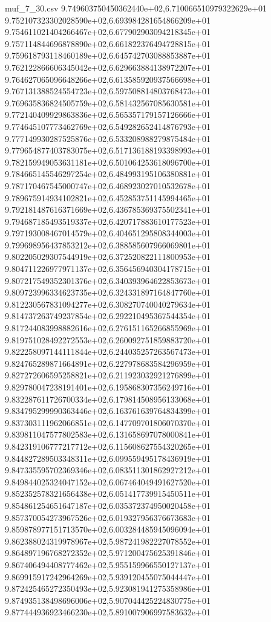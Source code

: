 \begin{filecontents*}{muf_7_30.csv}
9.749603750450362440e+02,6.710066510979322629e+01
9.752107323302028590e+02,6.693984281654866209e+01
9.754611021404266467e+02,6.677902903094218345e+01
9.757114844696878890e+02,6.661822376494728815e+01
9.759618793118460189e+02,6.645742703088853887e+01
9.762122866606345042e+02,6.629663884138972207e+01
9.764627065096648266e+02,6.613585920937566698e+01
9.767131388524554723e+02,6.597508814803768473e+01
9.769635836824505759e+02,6.581432567085630581e+01
9.772140409929863836e+02,6.565357179157126666e+01
9.774645107773462769e+02,6.549282652414876793e+01
9.777149930287525876e+02,6.533208988279875484e+01
9.779654877403783075e+02,6.517136188193398993e+01
9.782159949053631181e+02,6.501064253618096700e+01
9.784665145546297254e+02,6.484993195106380881e+01
9.787170467545000747e+02,6.468923027010532678e+01
9.789675914934102821e+02,6.452853751145994465e+01
9.792181487616371669e+02,6.436785369375502341e+01
9.794687185493519337e+02,6.420717883610177523e+01
9.797193008467014579e+02,6.404651295808344003e+01
9.799698956437853212e+02,6.388585607966069801e+01
9.802205029307544919e+02,6.372520822111800953e+01
9.804711226977971137e+02,6.356456940304178715e+01
9.807217549352301376e+02,6.340393964622853673e+01
9.809723996334623735e+02,6.324331897164847760e+01
9.812230567831094277e+02,6.308270740040279634e+01
9.814737263749237854e+02,6.292210495367544354e+01
9.817244083998882616e+02,6.276151165266855969e+01
9.819751028492272553e+02,6.260092751859883720e+01
9.822258097144111844e+02,6.244035257263567473e+01
9.824765289871664891e+02,6.227978683584296959e+01
9.827272606595258821e+02,6.211923032921276899e+01
9.829780047238191401e+02,6.195868307356249716e+01
9.832287611726700334e+02,6.179814508956133068e+01
9.834795299990363446e+02,6.163761639764834399e+01
9.837303111962066851e+02,6.147709701806070370e+01
9.839811047577802583e+02,6.131658697078000841e+01
9.842319106777217712e+02,6.115608627554320265e+01
9.844827289503348311e+02,6.099559495178436919e+01
9.847335595702369346e+02,6.083511301862927212e+01
9.849844025324047152e+02,6.067464049491627520e+01
9.852352578321656438e+02,6.051417739915450511e+01
9.854861254651647187e+02,6.035372374950020458e+01
9.857370054273967526e+02,6.019327956376673683e+01
9.859878977151713570e+02,6.003284485945096094e+01
9.862388024319978967e+02,5.987241982227078552e+01
9.864897196768272352e+02,5.971200475625391846e+01
9.867406494408777462e+02,5.955159966550127137e+01
9.869915917242964269e+02,5.939120455075044447e+01
9.872425465272350493e+02,5.923081941275358986e+01
9.874935138498696006e+02,5.907044425224830775e+01
9.877444936923466230e+02,5.891007906997583632e+01

\end{filecontents*}
